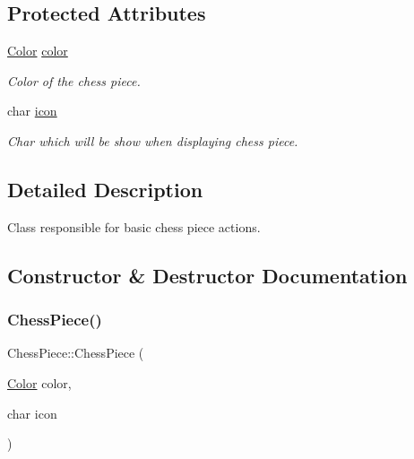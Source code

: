 \subsection*{Protected Attributes}
\begin{DoxyCompactItemize}
\item 
\mbox{\label{classChessPiece_a8c8fc170e7c719ac2b71a93a56a38f01}} 
\hyperlink{Enums_8h_ab87bacfdad76e61b9412d7124be44c1c}{Color} \hyperlink{classChessPiece_a8c8fc170e7c719ac2b71a93a56a38f01}{color}
\begin{DoxyCompactList}\small\item\em Color of the chess piece. \end{DoxyCompactList}\item 
\mbox{\label{classChessPiece_ad32540487648131ed69e63f46f787d08}} 
char \hyperlink{classChessPiece_ad32540487648131ed69e63f46f787d08}{icon}
\begin{DoxyCompactList}\small\item\em Char which will be show when displaying chess piece. \end{DoxyCompactList}\end{DoxyCompactItemize}


\subsection{Detailed Description}
Class responsible for basic chess piece actions. 

\subsection{Constructor \& Destructor Documentation}
\mbox{\label{classChessPiece_a38c44e06d7bf1b0f96d27886ca5d389f}} 
\subsubsection{\texorpdfstring{Chess\+Piece()}{ChessPiece()}}
{\footnotesize\ttfamily Chess\+Piece\+::\+Chess\+Piece (\begin{DoxyParamCaption}\item[{\hyperlink{Enums_8h_ab87bacfdad76e61b9412d7124be44c1c}{Color}}]{color,  }\item[{char}]{icon }\end{DoxyParamCaption})}



